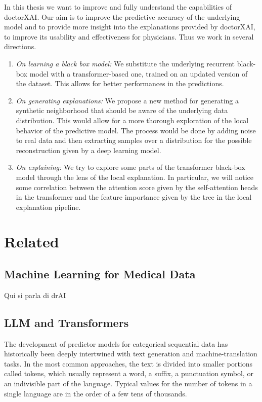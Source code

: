 \documentclass[]{marticle}
\begin{document}
In this thesis we want to improve and fully understand the capabilities of doctorXAI. Our aim is to
improve the predictive accuracy of the underlying model and to provide more insight into the
explanations provided by doctorXAI, to improve its usability and effectiveness for physicians. Thus
we work in several directions.
\begin{enumerate}
\item \emph{On learning a black box model:} We substitute the underlying recurrent black-box model
with a transformer-based one, trained on an updated version of the dataset. This allows for better
performances in the predictions.

\item \emph{On generating explanations:}  We propose a new method for generating a synthetic
neighborhood that should be aware of the underlying data distribution. This would allow for a more
thorough exploration of the local behavior of the predictive model. The process would be done by
adding noise to real data and then extracting samples over a distribution for the possible
reconstruction given by a deep learning model.

\item \emph{On explaining:} We try to explore some parts of the transformer black-box model
through the lens of the local explanation. In particular, we will notice some correlation between the
attention score given by the self-attention heads in the transformer and the feature importance
given by the tree in the local explanation pipeline.
\end{enumerate}

\section{Related}

\subsection{Machine Learning for Medical Data}

Qui si parla di drAI

\subsection{LLM and Transformers}

The development of predictor models for categorical sequential data has historically been deeply
intertwined with text generation and machine-translation tasks. In the most common approaches,
the text is divided into smaller portions called tokens, which usually represent a word, a suffix, a
punctuation symbol, or an indivisible part of the language. Typical values for the number
of tokens in a single language are in the order of a few tens of thousands.
\end{document}
